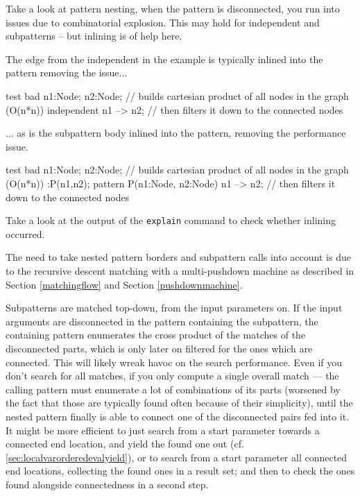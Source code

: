 \begin{example}
Take a look at pattern nesting, when the pattern is disconnected, you run into issues due to combinatorial explosion.
This may hold for independent and subpatterns -- but inlining is of help here.

The edge from the independent in the example is typically inlined into the pattern removing the issue...
\begin{grgen}
test bad {
	n1:Node; n2:Node; // builds cartesian product of all nodes in the graph (O(n*n))
  independent {
		n1 --> n2; // then filters it down to the connected nodes
  }
}
\end{grgen}
... as is the subpattern body inlined into the pattern, removing the performance issue.
\begin{grgen}
test bad {
	n1:Node; n2:Node; // builds cartesian product of all nodes in the graph (O(n*n))
  :P(n1,n2);
}
pattern P(n1:Node, n2:Node) {
	n1 --> n2; // then filters it down to the connected nodes
}
\end{grgen}
Take a look at the output of the \texttt{explain} command to check whether inlining occurred.
\end{example}

The need to take nested pattern borders and subpattern calls into account is due to the recursive descent matching with a multi-pushdown machine as described in Section \ref{matchingflow} and Section \ref{pushdownmachine}.

Subpatterns are matched top-down, from the input parameters on.
If the input arguments are disconnected in the pattern containing the subpattern, the containing pattern enumerates the cross product of the matches of the disconnected parts, which is only later on filtered for the ones which are connected.
This will likely wreak havoc on the search performance.
Even if you don't search for all matches, if you only compute a single overall match --- the calling pattern must enumerate a lot of combinations of its parts (worsened by the fact that those are typically found often because of their simplicity), until the nested pattern finally is able to connect one of the disconnected pairs fed into it.
It might be more efficient to just search from a start parameter towards a connected end location, and yield the found one out (cf. \ref{sec:localvarorderedevalyield}), or to search from a start parameter all connected end locations, collecting the found ones in a result set; and then to check the ones found alongside connectedness in a second step.

